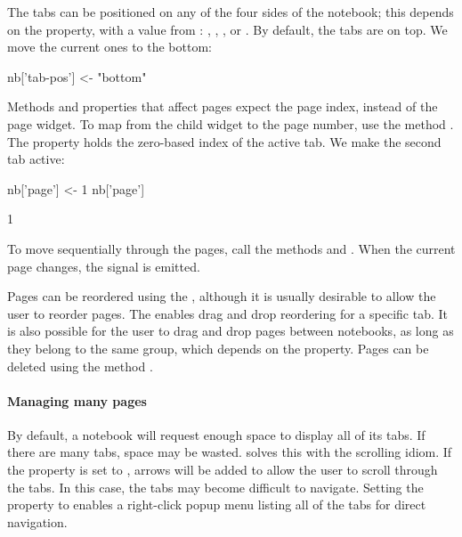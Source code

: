 The tabs can be positioned on any of the four sides of the notebook;
this depends on the  property, with a value from
: , , , or
. By default, the tabs are on top. We move the current ones to the
bottom:
\begin{Schunk}
\begin{Sinput}
 nb['tab-pos'] <- "bottom"
\end{Sinput}
\end{Schunk}

Methods and properties that affect pages expect the page index,
instead of the page widget. To map from the child widget to the page
number, use the method .  The
 property holds the zero-based index of the active
tab. We make the second tab active:
\begin{Schunk}
\begin{Sinput}
 nb['page'] <- 1
 nb['page']
\end{Sinput}
\begin{Soutput}
[1] 1
\end{Soutput}
\end{Schunk}
%
To move sequentially through the pages, call the methods
 and
. When the current page changes, the
 signal is emitted.

Pages can be reordered using the ,
although it is usually desirable to allow the user to reorder
pages. The  enables drag and
drop reordering for a specific tab. It is also possible for the user
to drag and drop pages between notebooks, as long as they belong to
the same group, which depends on the 
property. Pages can be deleted using the method
.

\paragraph{Managing many pages}
By default, a notebook will request enough space to display all of its
tabs. If there are many tabs, space may be wasted. 
solves this with the scrolling idiom. If the
property  is set to , arrows will be added
to allow the user to scroll through the tabs. In this case, the tabs
may become difficult to navigate. Setting the 
property to  enables a right-click popup menu listing all
of the tabs for direct navigation.

